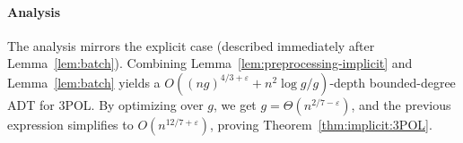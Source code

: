 \paragraph{Analysis}
The analysis mirrors the explicit case (described immediately after
Lemma~\ref{lem:batch}). Combining Lemma~\ref{lem:preprocessing-implicit} and
Lemma~\ref{lem:batch} yields a $O( {(ng)}^{4/3+\varepsilon} + n^2 \log g /
g)$-depth bounded-degree ADT for 3POL\@. By optimizing over $g$, we get $g =
\Theta(n^{2/7-\varepsilon})$, and the previous expression simplifies to
$O(n^{12/7+\varepsilon})$, proving Theorem~\ref{thm:implicit:3POL}.
